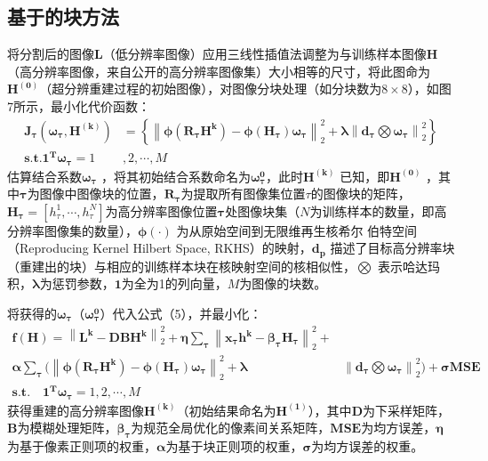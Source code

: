 \subsection{基于的块方法}

将分割后的图像$\boldsymbol{L}$（低分辨率图像）应用三线性插值法调整为与训练样本图像$\boldsymbol{H}$（高分辨率图像，来自公开的高分辨率图像集）大小相等的尺寸，将此图命为$\boldsymbol{H^{(0)}}$（超分辨重建过程的初始图像），对图像分块处理（如分块数为$8\times8$），如图7所示，最小化代价函数：
\begin{equation}
 \label{eq5}
 \begin{split}
   \boldsymbol{J_{\tau }(\omega _{\tau },H^{(k)})} & =\left \{ \left \| \boldsymbol{\phi (R_{\tau }H^{k})}-\boldsymbol{\phi (H_{\tau })\omega _{\tau }} \right \| _{2}^{2}+\boldsymbol{\lambda} \left \| \boldsymbol{d_{\tau }}\bigotimes \boldsymbol{\omega _{\tau }} \right \|_{2}^{2}\right \} \\
   \boldsymbol{s.t. 1^{T}\omega _{\tau }}= 1 & ,2,\cdots ,M
 \end{split}
\end{equation}
估算结合系数$\boldsymbol{\omega _{\tau }}$ ，将其初始结合系数命名为$\boldsymbol{\omega_{\tau }^{0}}$，此时$\boldsymbol{H^{(k)}}$ 已知，即$\boldsymbol{H^{(0)}}$ ，其中$\boldsymbol{\tau}$为图像中图像块的位置，$\boldsymbol{R_{\tau }}$为提取所有图像集位置$\tau$的图像块的矩阵， $\boldsymbol{H_{\tau }}=\left [ h_{\tau }^{1},\cdots ,h_{\tau }^{N} \right ]$为高分辨率图像位置$\boldsymbol{\tau}$处图像块集（$N$为训练样本的数量，即高分辨率图像集的数量），$\boldsymbol{\phi (\cdot )}$ 为从原始空间到无限维再生核希尔 伯特空间（Reproducing Kernel Hilbert Space, RKHS）的映射，$\boldsymbol{d_{p}}$ 描述了目标高分辨率块（重建出的块）与相应的训练样本块在核映射空间的核相似性，$\bigotimes$ 表示哈达玛积，$\boldsymbol{\lambda}$为惩罚参数，$\boldsymbol{1}$为全为1的列向量，$M$为图像的块数。

将获得的$\boldsymbol{\omega _{\tau }}$（$\boldsymbol{\omega_{\tau }^{0}}$）代入公式（5），并最小化：
\begin{equation}
 \label{eq6}
 \begin{split}
   \boldsymbol{f(H)}= \left \| \boldsymbol{L^{k}}-\boldsymbol{DBH^{k}} \right \|_{2}^{2}+\boldsymbol{\eta \sum_{\tau }}\left \| \boldsymbol{x_{\tau }h^{k}}-\boldsymbol{\beta _{\tau }H_{\tau }} \right \|_{2}^{2}+ \\
   \boldsymbol{\alpha \sum_{\tau }}(\left \| \boldsymbol{\phi (R_{\tau }H^{k})}-\boldsymbol{\phi (H_{\tau })\omega _{\tau } }\right \|_{2}^{2}+ \boldsymbol{\lambda} & \left \| \boldsymbol{d_{\tau }}\bigotimes \boldsymbol{\omega _{\tau } }\right \|_{2}^{2})+\boldsymbol{\sigma MSE} \\
   \boldsymbol{s.t. \quad 1^{T}\omega _{\tau }}= 1,2,\cdots ,M \qquad \qquad \qquad \qquad \qquad \quad &
 \end{split}
\end{equation}
获得重建的高分辨率图像$\boldsymbol{H^{(k)}}$（初始结果命名为$\boldsymbol{H^{(1)}}$），其中$\boldsymbol{D}$为下采样矩阵，$\boldsymbol{B}$为模糊处理矩阵，$\boldsymbol{\beta _{\tau }}$为规范全局优化的像素间关系矩阵，$\boldsymbol{MSE}$为均方误差，$\boldsymbol{\eta }$为基于像素正则项的权重，$\boldsymbol{\alpha}$为基于块正则项的权重，$\boldsymbol{\sigma}$为均方误差的权重。

